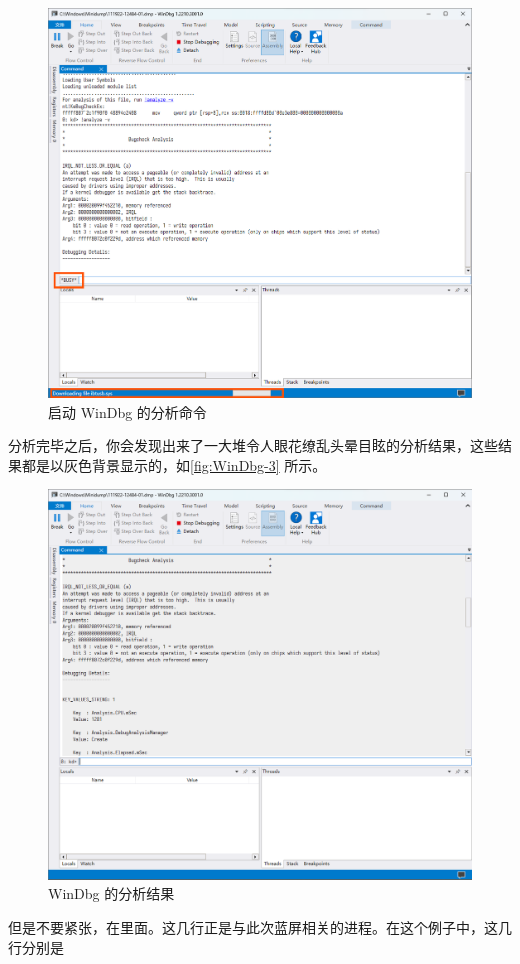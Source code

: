 \begin{figure}[htb!]
  \centering
  \includegraphics[width=.75\textwidth]{assets/advanced/WinDbg-2.png}
  \caption{启动 WinDbg 的分析命令}
  \label{fig:WinDbg-2}
\end{figure}

分析完毕之后，你会发现出来了一大堆令人眼花缭乱头晕目眩的分析结果，这些结果都是以灰色背景显示的，如\autoref{fig:WinDbg-3} 所示。

\begin{figure}[htb!]
  \centering
  \includegraphics[width=.75\textwidth]{assets/advanced/WinDbg-3.png}
  \caption{WinDbg 的分析结果}
  \label{fig:WinDbg-3}
\end{figure}

但是不要紧张，在里面\cprotect{}。这几行正是与此次蓝屏相关的进程。在这个例子中，这几行分别是

